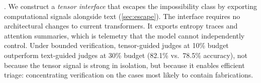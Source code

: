 . We construct a \emph{tensor interface} that escapes the impossibility
class by exporting computational signals alongside text
(\autoref{sec:escape}). The interface requires no architectural changes to
current transformers. It exports entropy traces and attention summaries, which is telemetry
that the model cannot independently control. Under bounded verification,
tensor-guided judges at 10\% budget outperform text-guided judges at 30\%
budget (82.1\% vs.\ 78.5\% accuracy), not because the tensor signal is
strong in isolation, but because it enables efficient triage: concentrating
verification on the cases most likely to contain fabrications.
